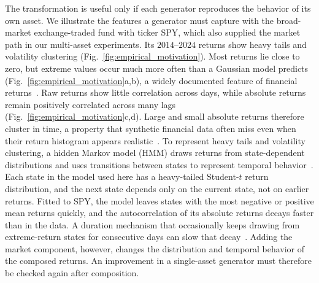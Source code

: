 The transformation is useful only if each generator reproduces the
behavior of its own asset. We illustrate the features a generator must
capture with the broad-market exchange-traded fund with ticker SPY,
which also supplied the market path in our multi-asset experiments.
Its $2014$--$2024$ returns show heavy tails and volatility clustering
(Fig.~\ref{fig:empirical_motivation}). Most returns lie close to zero,
but extreme values occur much more often than a Gaussian model
predicts (Fig.~\ref{fig:empirical_motivation}a,b), a widely documented
feature of financial returns~\cite{mandelbrot1963, cont2001}. Raw
returns show little correlation across days, while absolute returns
remain positively correlated across many lags
(Fig.~\ref{fig:empirical_motivation}c,d). Large and small absolute
returns therefore cluster in time, a property that synthetic
financial data often miss even when their return histogram appears
realistic~\cite{stengerEtAl2024}. To represent heavy tails and
volatility clustering, a hidden Markov model (HMM) draws returns from
state-dependent distributions
and uses transitions between states to represent temporal
behavior~\cite{rabinerJuang1986, rydenTerasvirtaAsbrink1998}. Each state
in the model used here has a heavy-tailed Student-$t$ return
distribution, and the next state depends only on the current state,
not on earlier returns. Fitted to SPY, the model leaves states with
the most negative or positive mean returns quickly, and the
autocorrelation of its absolute returns decays faster than in the
data. A duration
mechanism that occasionally keeps drawing from extreme-return states
for consecutive days can slow that decay~\cite{bullaBulla2006}.
Adding the market component, however, changes the distribution and
temporal behavior of the composed returns. An improvement in a
single-asset generator must therefore be checked again after
composition.


